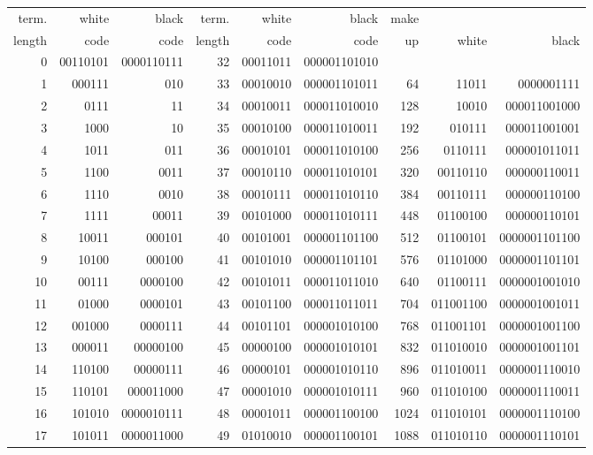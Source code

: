 \smallskip
\begin{center}
{\fnsize
\begin{tabular}{|rrr|rrr|rrr|}
\hline
term. & white &black & term. & white &black &make & &\\
length & code & code & length & code & code & up  & white & black\\
\hline
0 & 00110101 & 0000110111 &  32 & 00011011 & 000001101010 & & &\\
1 & 000111 & 010 &  33 & 00010010 & 000001101011 & 64 & 11011 & 0000001111\\
2 & 0111 & 11 &  34 & 00010011 & 000011010010  & 128 & 10010 & 000011001000\\
3 & 1000 & 10 &  35 & 00010100 & 000011010011 & 192 & 010111 & 000011001001\\
4 & 1011 & 011 &  36 & 00010101 & 000011010100 & 256 & 0110111 & 000001011011\\
5 & 1100 & 0011 &  37 & 00010110 & 000011010101 & 320 & 00110110 & 000000110011\\
6 & 1110 & 0010 &  38 & 00010111 & 000011010110 & 384 & 00110111 & 000000110100\\
7 & 1111 & 00011 &  39 & 00101000 & 000011010111 & 448 & 01100100 & 000000110101\\
8 & 10011 & 000101 &  40 & 00101001 & 000001101100 & 512 & 01100101 & 0000001101100\\
9 & 10100 & 000100 &  41 & 00101010 & 000001101101 & 576 & 01101000 & 0000001101101\\
10 & 00111 & 0000100 &  42 & 00101011 & 000011011010 & 640 & 01100111 & 0000001001010\\
11 & 01000 & 0000101 &  43 & 00101100 & 000011011011 & 704 & 011001100 & 0000001001011\\
12 & 001000 & 0000111 &  44 & 00101101 & 000001010100 & 768 & 011001101 & 0000001001100\\
13 & 000011 & 00000100 &  45 & 00000100 & 000001010101 & 832 & 011010010 & 0000001001101\\
14 & 110100 & 00000111 &  46 & 00000101 & 000001010110 & 896 & 011010011 & 0000001110010\\
15 & 110101 & 000011000 &  47 & 00001010 & 000001010111 & 960 & 011010100 & 0000001110011\\
16 & 101010 & 0000010111 &  48 & 00001011 & 000001100100 & 1024 & 011010101 & 0000001110100\\
17 & 101011 & 0000011000 &  49 & 01010010 & 000001100101 & 1088 & 011010110 & 0000001110101\\

\end{tabular}}
\end{center}
